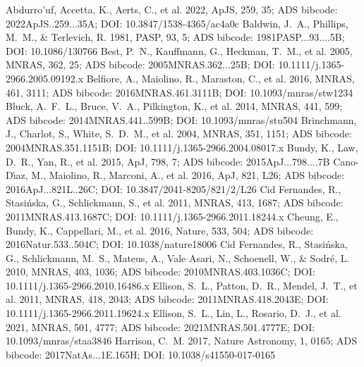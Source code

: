 \documentclass[twocolumn]{aastex631}
\begin{document}
\begin{thebibliography}{}
 Abdurro'uf, Accetta, K., Aerts, C., et al. 2022, ApJS, 259, 35; ADS bibcode: 2022ApJS..259...35A; DOI: 10.3847/1538-4365/ac4a0c
 Baldwin, J.~A., Phillips, M.~M., \& Terlevich, R. 1981, PASP, 93, 5; ADS bibcode: 1981PASP...93....5B; DOI: 10.1086/130766
 Best, P.~N., Kauffmann, G., Heckman, T.~M., et al. 2005, MNRAS, 362, 25; ADS bibcode: 2005MNRAS.362...25B; DOI: 10.1111/j.1365-2966.2005.09192.x
 Belfiore, A., Maiolino, R., Maraston, C., et al. 2016, MNRAS, 461, 3111; ADS bibcode: 2016MNRAS.461.3111B; DOI: 10.1093/mnras/stw1234
 Bluck, A.~F.~L., Bruce, V.~A., Pilkington, K., et al. 2014, MNRAS, 441, 599; ADS bibcode: 2014MNRAS.441..599B; DOI: 10.1093/mnras/stu504
 Brinchmann, J., Charlot, S., White, S.~D.~M., et al. 2004, MNRAS, 351, 1151; ADS bibcode: 2004MNRAS.351.1151B; DOI: 10.1111/j.1365-2966.2004.08017.x
 Bundy, K., Law, D.~R., Yan, R., et al. 2015, ApJ, 798, 7; ADS bibcode: 2015ApJ...798....7B
 Cano-D\'{\i}az, M., Maiolino, R., Marconi, A., et al. 2016, ApJ, 821, L26; ADS bibcode: 2016ApJ...821L..26C; DOI: 10.3847/2041-8205/821/2/L26
 Cid Fernandes, R., Stasi{\'n}ska, G., Schlickmann, S., et al. 2011, MNRAS, 413, 1687; ADS bibcode: 2011MNRAS.413.1687C; DOI: 10.1111/j.1365-2966.2011.18244.x
 Cheung, E., Bundy, K., Cappellari, M., et al. 2016, Nature, 533, 504; ADS bibcode: 2016Natur.533..504C; DOI: 10.1038/nature18006
 Cid Fernandes, R., Stasi{\'n}ska, G., Schlickmann, M.~S., Mateus, A., Vale Asari, N., Schoenell, W., \& Sodr{\'e}, L. 2010, MNRAS, 403, 1036; ADS bibcode: 2010MNRAS.403.1036C; DOI: 10.1111/j.1365-2966.2010.16486.x
 Ellison, S.~L., Patton, D.~R., Mendel, J.~T., et al. 2011, MNRAS, 418, 2043; ADS bibcode: 2011MNRAS.418.2043E; DOI: 10.1111/j.1365-2966.2011.19624.x
 Ellison, S.~L., Lin, L., Rosario, D.~J., et al. 2021, MNRAS, 501, 4777; ADS bibcode: 2021MNRAS.501.4777E; DOI: 10.1093/mnras/staa3846
 Harrison, C.~M. 2017, Nature Astronomy, 1, 0165; ADS bibcode: 2017NatAs...1E.165H; DOI: 10.1038/s41550-017-0165

\end{thebibliography}
\end{document}
